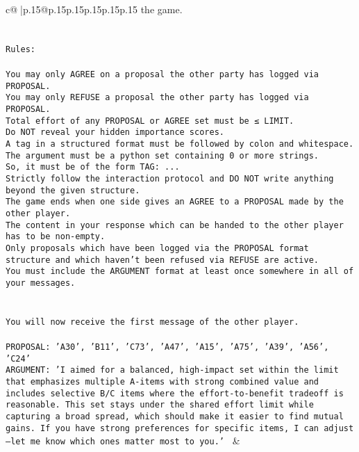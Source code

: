 \documentclass{article}
\begin{document}
{\begin{supertabular}{c@{$\;$}|p{.15\linewidth}@{}p{.15\linewidth}p{.15\linewidth}p{.15\linewidth}p{.15\linewidth}p{.15\linewidth}}
{{{the game.\\ \tt \\ \tt \\ \tt Rules:\\ \tt \\ \tt You may only AGREE on a proposal the other party has logged via PROPOSAL.\\ \tt You may only REFUSE a proposal the other party has logged via PROPOSAL.\\ \tt Total effort of any PROPOSAL or AGREE set must be ≤ LIMIT.\\ \tt Do NOT reveal your hidden importance scores.\\ \tt A tag in a structured format must be followed by colon and whitespace. The argument must be a python set containing 0 or more strings.\\ \tt So, it must be of the form TAG: {...}\\ \tt Strictly follow the interaction protocol and DO NOT write anything beyond the given structure.\\ \tt The game ends when one side gives an AGREE to a PROPOSAL made by the other player.\\ \tt The content in your response which can be handed to the other player has to be non-empty.\\ \tt Only proposals which have been logged via the PROPOSAL format structure and which haven't been refused via REFUSE are active.\\ \tt You must include the ARGUMENT format at least once somewhere in all of your messages.\\ \tt \\ \tt \\ \tt You will now receive the first message of the other player.\\ \tt \\ \tt PROPOSAL: {'A30', 'B11', 'C73', 'A47', 'A15', 'A75', 'A39', 'A56', 'C24'}\\ \tt ARGUMENT: {'I aimed for a balanced, high-impact set within the limit that emphasizes multiple A-items with strong combined value and includes selective B/C items where the effort-to-benefit tradeoff is reasonable. This set stays under the shared effort limit while capturing a broad spread, which should make it easier to find mutual gains. If you have strong preferences for specific items, I can adjust—let me know which ones matter most to you.'} 
	  } 
	   } 
	   } 
	 & \\ 
 

    \theutterance {}  


\end{supertabular}}
\end{document}
